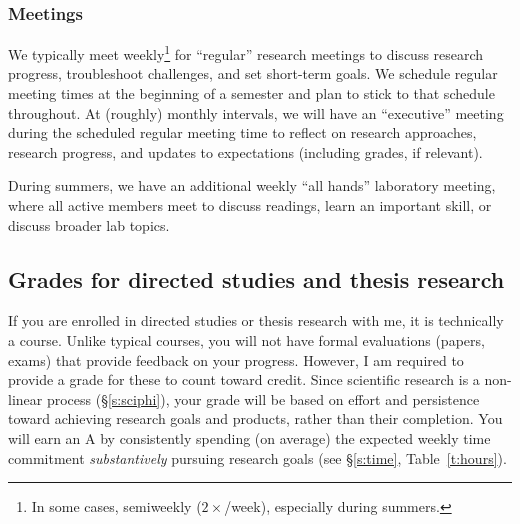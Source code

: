 \subsubsection{Meetings}
We typically meet weekly\footnote{In some cases, semiweekly ($2\times$/week), especially during summers.} for ``regular'' research meetings to discuss research progress, troubleshoot challenges, and set short-term goals. 
We schedule regular meeting times at the beginning of a semester and plan to stick to that schedule throughout.
At (roughly) monthly intervals, we will have an ``executive'' meeting during the scheduled regular meeting time to reflect on research approaches, research progress, and updates to expectations (including grades, if relevant).

During summers, we have an additional weekly ``all hands'' laboratory meeting, where all active \grackle{} members meet to discuss readings, learn an important skill, or discuss broader lab topics. 

\subsection{Grades for directed studies and thesis research}\label{s:course}
If you are enrolled in directed studies or thesis research with me, it is technically a course.
Unlike typical courses, you will not have formal evaluations (papers, exams) that provide feedback on your progress. 
However, I am required to provide a grade for these to count toward credit. 
Since scientific research is a non-linear process (\S\ref{s:sciphi}), your grade will be based on effort and persistence toward achieving research goals and products, rather than their completion.
You will earn an A by consistently spending (on average) the expected weekly time commitment \emph{substantively} pursuing research goals (see \S\ref{s:time}, Table~\ref{t:hours}). 


